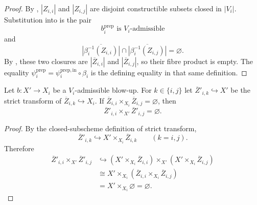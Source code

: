 \begin{proof}
  By ,
  $|Z_{i,i}|$ and $|Z_{i,j}|$ are disjoint constructible subsets closed in
  $|V_i|$.  Substitution into
   is the pair
  \[
    b_i^{\mathrm{prep}}\text{ is }V_i\text{-admissible}
  \]
  and
  \[
    \overline{|\beta_i^{-1}(Z_{i,i})|}
      \cap
    \overline{|\beta_i^{-1}(Z_{i,j})|}
    =\varnothing.
  \]
  By , these two closures are
  $|\overline Z_{i,i}|$ and $|\overline Z_{i,j}|$, so their fibre product is
  empty.  The equality
  $\psi_i^{\mathrm{prep}}
    =\psi_i^{\mathrm{prep,in}}\circ\beta_i$ is the defining
  equality in that same definition.
\end{proof}

\begin{lemma}
  \label{lemma:nagata-boundary-disjoint-persists}

  Let $b\colon X'\to X_i$ be a $V_i$-admissible blow-up.  For
  $k\in\{i,j\}$ let $\overline Z'_{i,k}\hookrightarrow X'$ be the strict
  transform of $\overline Z_{i,k}\hookrightarrow X_i$.  If
  $\overline Z_{i,i}\times_{X_i}\overline Z_{i,j}=\varnothing$, then
  \[
    \overline Z'_{i,i}\times_{X'}\overline Z'_{i,j}=\varnothing.
  \]
\end{lemma}

\begin{proof}
  By the closed-subscheme definition of strict transform,
  \[
    \overline Z'_{i,k}
      \hookrightarrow X'\times_{X_i}\overline Z_{i,k}
      \qquad(k=i,j).
  \]
  Therefore
  \[
  \begin{aligned}
    \overline Z'_{i,i}\times_{X'}\overline Z'_{i,j}
      &\hookrightarrow
        (X'\times_{X_i}\overline Z_{i,i})
          \times_{X'}
        (X'\times_{X_i}\overline Z_{i,j})\\
      &\cong
        X'\times_{X_i}
          (\overline Z_{i,i}\times_{X_i}\overline Z_{i,j})\\
      &=X'\times_{X_i}\varnothing
       =\varnothing.
  \end{aligned}
  \]
\end{proof}

